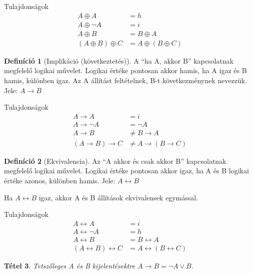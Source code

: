\documentclass[twoside,12pt]{report}
\newtheorem{theorem}{Tétel}[section]
\theoremstyle{definition}
\newtheorem{definition}[theorem]{Definíció}
\begin{document}
	\begin{outline}
		\1 Tulajdonságok
			\2[] 
			\begin{align*}
				A\oplus A&=h\\
				A\oplus \neg A&=i\\
				A\oplus B&=B\oplus A\tag{Kommutatív}\\
				(A\oplus B)\oplus C&=A\oplus(B\oplus C)\tag{Asszociatív}
			\end{align*}
	\end{outline}
	\begin{definition}[Implikáció (következtetés)]
		A \enquote{ha A, akkor B} kapcsolatnak megfelelő logikai művelet. Logikai értéke pontosan akkor hamis, ha A igaz és B hamis, különben igaz. Az A állítást feltételnek, B-t következménynek nevezzük. Jele: $A\rightarrow B$
	\end{definition}
	\begin{outline}
		\1 Tulajdonságok
			\2[] 
			\begin{align*}
				A\rightarrow A&=i\\
				A\rightarrow \neg A&=\neg A\\
				A\rightarrow B&\ne B\rightarrow A\tag{Nem kommutatív}\\
				(A\rightarrow B)\rightarrow C&\ne A\rightarrow(B\rightarrow C)\tag{Nem asszociatív}
			\end{align*}
	\end{outline}
	\begin{definition}[Ekvivalencia]
		Az \enquote{A akkor és csak akkor B} kapcsolatnak megfelelő logikai művelet. Logikai értéke pontosan akkor igaz, ha A és B logikai értéke azonos, különben hamis. Jele: $A\leftrightarrow B$
	\end{definition}
	Ha $A\leftrightarrow B$ igaz, akkor A és B állítások ekvivalensek egymással.
	\begin{outline}
		\1 Tulajdonságok
			\2[] 
			\begin{align*}
				A\leftrightarrow A&=i\\
				A\leftrightarrow \neg A&=h\\
				A\leftrightarrow B&=B\leftrightarrow A\tag{Kommutatív}\\
				(A\leftrightarrow B)\leftrightarrow C&=A\leftrightarrow(B\leftrightarrow C) \tag{Asszociatív}
			\end{align*}
	\end{outline}
	\begin{theorem}
		Tetszőleges A és B kijelentésektre $A\rightarrow B=\neg A\vee B$.
	\end{theorem}
\end{document}
